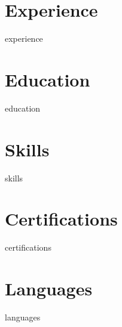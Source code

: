 \documentclass[11pt,a4paper,sans]{moderncv}  %
\begin{document}
\makecvtitle  %


\section{Experience}
{{{experience}}}

\section{Education}
{{{education}}}

\section{Skills}
{{{skills}}}

\section{Certifications}
{{{certifications}}}

\section{Languages}
{{{languages}}}
\end{document}
